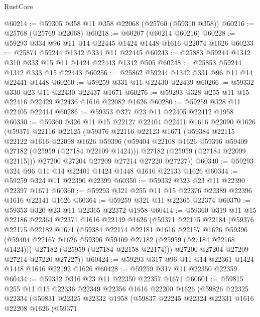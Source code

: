 \begin{lexlean}{RustCore}
\begin{coremodule}
@60214 := @59305 @358 @11 @358 @22068 (@25760 (@59310 @358))
@60216 := @25768 (@25769 @22068)
@60218 := @60207 (@60214 @60216)
@60228 := @59293 @334 @96 @11 @14 @22445 @1424 @1448 @1616 @22074 @1626
@60233 := @25874 @59244 @1342 @334 @11 @22445
@60243 := @25883 @59244 @1342 @310 @333 @15 @11 @1424 @22443 @1342 @505
@60248 := @25853 @59244 @1342 @333 @15 @22443
@60256 := @25862 @59244 @1342 @331 @96 @11 @14 @22441 @1448
@60260 := @59259 @331 @11 @22430 @22439
@60266 := @59332 @330 @23 @11 @22430 @22437 @1671
@60276 := @59293 @328 @255 @11 @15 @22416 @22429 @22436 @1616 @22082 @1626
@60280 := @59259 @328 @11 @22405 @22414
@60286 := @59353 @327 @23 @11 @22405 @22412 @1958
@60330 := @59360
    @326
    @11
    @15
    @22127
    @22404
    @22411
    @1616
    @22090
    @1626
    (@59371
      @22116
      @22125
      (@59376
        @22116
        @22123
        @1671
        (@59384
          @22115
          @22122
          @1616
          @22098
          @1626
          @59396
          (@59404 @22108 @1626 @59396 @59409 @27182 (@25959 (@27184 @22109 @1424)))
          @27182
          (@25959 (@27184 @22099 @22115)))
        @27200
        @27204
        @27209
        @27214
        @27220
        @27227))
@60340 := @59293 @324 @96 @11 @14 @22401 @1424 @1448 @1616 @22133 @1626
@60344 := @59259 @324 @11 @22390 @22399
@60350 := @59332 @323 @23 @11 @22390 @22397 @1671
@60360 := @59293 @321 @255 @11 @15 @22376 @22389 @22396 @1616 @22141 @1626
@60364 := @59259 @321 @11 @22365 @22374
@60370 := @59353 @320 @23 @11 @22365 @22372 @1958
@60414 := @59360
    @319
    @11
    @15
    @22186
    @22364
    @22371
    @1616
    @22149
    @1626
    (@59371
      @22175
      @22184
      (@59376
        @22175
        @22182
        @1671
        (@59384
          @22174
          @22181
          @1616
          @22157
          @1626
          @59396
          (@59404 @22167 @1626 @59396 @59409 @27182 (@25959 (@27184 @22168 @1424)))
          @27182
          (@25959 (@27184 @22158 @22174)))
        @27200
        @27204
        @27209
        @27214
        @27220
        @27227))
@60424 := @59293 @317 @96 @11 @14 @22361 @1424 @1448 @1616 @22192 @1626
@60428 := @59259 @317 @11 @22350 @22359
@60434 := @59332 @316 @23 @11 @22350 @22357 @1671
@60601 := @59815
    @255
    @11
    @15
    @22336
    @22349
    @22356
    @1616
    @22200
    @1626
    (@59826
      @22325
      @22334
      (@59831
        @22325
        @22332
        @1958
        (@59837
          @22245
          @22324
          @22331
          @1616
          @22208
          @1626
          (@59371

\end{coremodule}
\end{lexlean}
